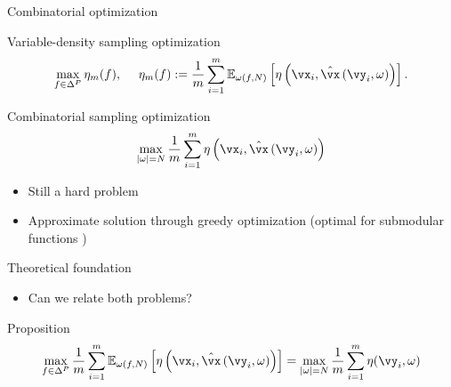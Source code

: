 \begin{frame}{Combinatorial optimization}
\begin{block}{Variable-density sampling optimization}
$$\max_{f\in \Delta^P}  \eta_m (f), \text{~~~~} \eta_m (f) :=\frac{1}{m} \sum_{i=1}^m \mathbb{E}_{\omega(f,N)}\left[\eta\left(\vx_i, {\hat{\vx}}\left(\vy_i, \omega\right)\right)\right].$$
\end{block}

\begin{block}{Combinatorial sampling optimization \parencite{gozcu2018learning}}
$$ \max_{|\omega|=N}  \frac{1}{m}\sum_{i=1}^m \eta\left(\vx_i, {\hat{\vx}}\left(\vy_i, \omega\right)\right) $$
\end{block}
\pause
\begin{itemize}
\item Still a hard problem
\item Approximate solution through greedy optimization (optimal for submodular functions \parencite{minoux1978accelerated})
\end{itemize}

\end{frame}
\begin{frame}{Theoretical foundation}
\begin{itemize}
\item Can we relate both problems?\\
\end{itemize}

\begin{block}{Proposition \parencite{sanchez2019scalable}}
$$ \max_{f\in \Delta^P}  \frac{1}{m} \sum_{i=1}^m \mathbb{E}_{\omega(f,N)}\left[\eta\left(\vx_i, {\hat{\vx}}\left(\vy_i, \omega\right)\right)\right] =  \max_{|\omega|=N}  \frac{1}{m}\sum_{i=1}^m \eta(\vy_{i}, \omega)$$
\end{block}
\end{frame}


